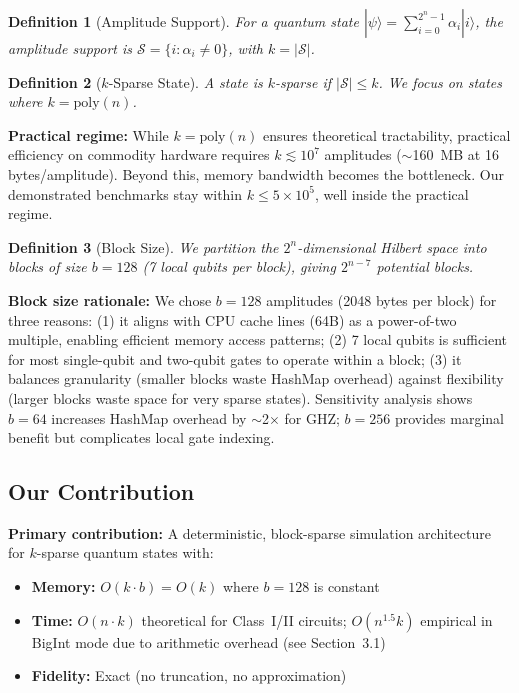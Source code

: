 \documentclass[11pt,twocolumn]{article}
\newtheorem{definition}{Definition}
\begin{document}
\begin{definition}[Amplitude Support]
For a quantum state $|\psi\rangle = \sum_{i=0}^{2^n-1} \alpha_i |i\rangle$, the \emph{amplitude support} is $\mathcal{S} = \{i : \alpha_i \neq 0\}$, with $k = |\mathcal{S}|$.
\end{definition}

\begin{definition}[$k$-Sparse State]
A state is \emph{$k$-sparse} if $|\mathcal{S}| \leq k$. We focus on states where $k = \text{poly}(n)$.
\end{definition}

\textbf{Practical regime:} While $k = \text{poly}(n)$ ensures theoretical tractability, practical efficiency on commodity hardware requires $k \lesssim 10^7$ amplitudes ($\sim$160~MB at 16 bytes/amplitude). Beyond this, memory bandwidth becomes the bottleneck. Our demonstrated benchmarks stay within $k \leq 5 \times 10^5$, well inside the practical regime.

\begin{definition}[Block Size]
We partition the $2^n$-dimensional Hilbert space into blocks of size $b = 128$ (7 local qubits per block), giving $2^{n-7}$ potential blocks.
\end{definition}

\textbf{Block size rationale:} We chose $b = 128$ amplitudes (2048 bytes per block) for three reasons: (1) it aligns with CPU cache lines (64B) as a power-of-two multiple, enabling efficient memory access patterns; (2) 7 local qubits is sufficient for most single-qubit and two-qubit gates to operate within a block; (3) it balances granularity (smaller blocks waste HashMap overhead) against flexibility (larger blocks waste space for very sparse states). Sensitivity analysis shows $b = 64$ increases HashMap overhead by $\sim$2$\times$ for GHZ; $b = 256$ provides marginal benefit but complicates local gate indexing.

\subsection{Our Contribution}

\textbf{Primary contribution:} A deterministic, block-sparse simulation architecture for $k$-sparse quantum states with:
\begin{itemize}
    \item \textbf{Memory:} $O(k \cdot b) = O(k)$ where $b = 128$ is constant
    \item \textbf{Time:} $O(n \cdot k)$ theoretical for Class~I/II circuits; $O(n^{1.5} k)$ empirical in BigInt mode due to arithmetic overhead (see Section~3.1)
    \item \textbf{Fidelity:} Exact (no truncation, no approximation)
\end{itemize}
\end{document}
